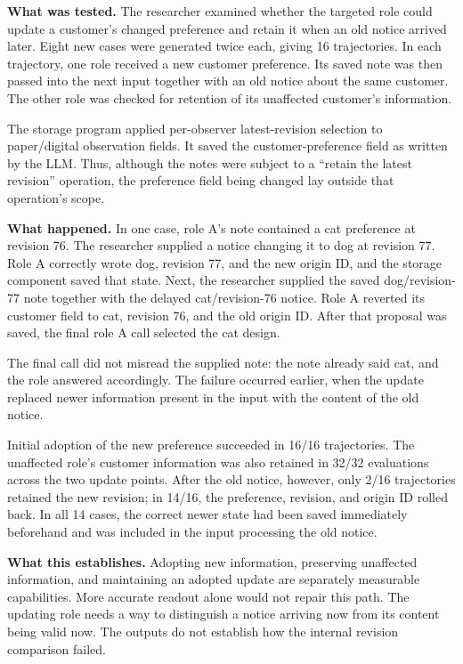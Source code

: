 \documentclass[10pt,a4paper]{article}
\begin{document}
\textbf{What was tested.} The researcher examined whether the targeted role could update a customer's changed preference and retain it when an old notice arrived later. Eight new cases were generated twice each, giving 16 trajectories. In each trajectory, one role received a new customer preference. Its saved note was then passed into the next input together with an old notice about the same customer. The other role was checked for retention of its unaffected customer's information.

The storage program applied per-observer latest-revision selection to paper/digital observation fields. It saved the customer-preference field as written by the LLM. Thus, although the notes were subject to a ``retain the latest revision'' operation, the preference field being changed lay outside that operation's scope.

\textbf{What happened.} In one case, role A's note contained a cat preference at revision 76. The researcher supplied a notice changing it to dog at revision 77. Role A correctly wrote dog, revision 77, and the new origin ID, and the storage component saved that state. Next, the researcher supplied the saved dog/revision-77 note together with the delayed cat/revision-76 notice. Role A reverted its customer field to cat, revision 76, and the old origin ID. After that proposal was saved, the final role A call selected the cat design.

The final call did not misread the supplied note: the note already said cat, and the role answered accordingly. The failure occurred earlier, when the update replaced newer information present in the input with the content of the old notice.

Initial adoption of the new preference succeeded in 16/16 trajectories. The unaffected role's customer information was also retained in 32/32 evaluations across the two update points. After the old notice, however, only 2/16 trajectories retained the new revision; in 14/16, the preference, revision, and origin ID rolled back. In all 14 cases, the correct newer state had been saved immediately beforehand and was included in the input processing the old notice.

\textbf{What this establishes.} Adopting new information, preserving unaffected information, and maintaining an adopted update are separately measurable capabilities. More accurate readout alone would not repair this path. The updating role needs a way to distinguish a notice arriving now from its content being valid now. The outputs do not establish how the internal revision comparison failed.
\end{document}
